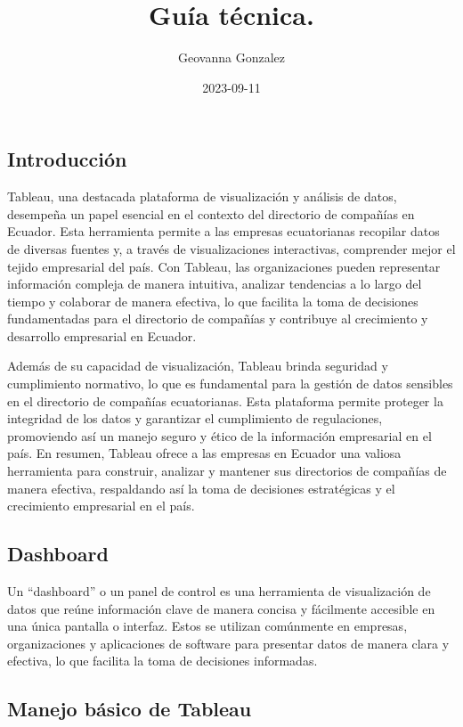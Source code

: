 \documentclass[
]{article}
\title{Guía técnica.}
\author{Geovanna Gonzalez}
\date{2023-09-11}
\begin{document}
\maketitle

\hypertarget{introducciuxf3n}{%
\subsection{Introducción}\label{introducciuxf3n}}

Tableau, una destacada plataforma de visualización y análisis de datos,
desempeña un papel esencial en el contexto del directorio de compañías
en Ecuador. Esta herramienta permite a las empresas ecuatorianas
recopilar datos de diversas fuentes y, a través de visualizaciones
interactivas, comprender mejor el tejido empresarial del país. Con
Tableau, las organizaciones pueden representar información compleja de
manera intuitiva, analizar tendencias a lo largo del tiempo y colaborar
de manera efectiva, lo que facilita la toma de decisiones fundamentadas
para el directorio de compañías y contribuye al crecimiento y desarrollo
empresarial en Ecuador.

Además de su capacidad de visualización, Tableau brinda seguridad y
cumplimiento normativo, lo que es fundamental para la gestión de datos
sensibles en el directorio de compañías ecuatorianas. Esta plataforma
permite proteger la integridad de los datos y garantizar el cumplimiento
de regulaciones, promoviendo así un manejo seguro y ético de la
información empresarial en el país. En resumen, Tableau ofrece a las
empresas en Ecuador una valiosa herramienta para construir, analizar y
mantener sus directorios de compañías de manera efectiva, respaldando
así la toma de decisiones estratégicas y el crecimiento empresarial en
el país.

\hypertarget{dashboard}{%
\subsection{Dashboard}\label{dashboard}}

Un ``dashboard'' o un panel de control es una herramienta de
visualización de datos que reúne información clave de manera concisa y
fácilmente accesible en una única pantalla o interfaz. Estos se utilizan
comúnmente en empresas, organizaciones y aplicaciones de software para
presentar datos de manera clara y efectiva, lo que facilita la toma de
decisiones informadas.

\hypertarget{manejo-buxe1sico-de-tableau}{%
\subsection{Manejo básico de
Tableau}\label{manejo-buxe1sico-de-tableau}}
\end{document}

